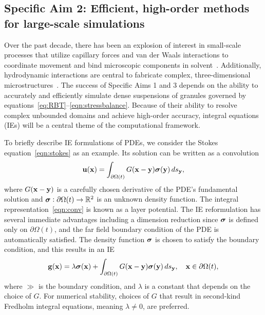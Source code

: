 \subsection{Specific Aim 2: Efficient, high-order methods for
large-scale simulations}
\label{sec:specificaim2}
Over the past decade, there has been an explosion of interest in
small-scale processes that utilize capillary forces and van der Waals
interactions to coordinate movement and bind microscopic components in
solvent~\cite{Pandey2011, Zhang2017, Siontorou2017}. Additionally,
hydrodynamic interactions are central to fabricate complex,
three-dimensional microstructures~\cite{Dasgupta2017, Leong2007,
Reynolds2019, Cho2010}.
The success of Specific Aims 1 and 3 depends on the ability to
accurately and efficiently simulate dense suspensions of granules
governed by equations~\eqref{eq:RBT}--\eqref{eqn:stressbalance}. Because
of their ability to resolve complex unbounded domains and achieve
high-order accuracy, integral equations (IEs) will be a central theme of
the computational framework. 

To briefly describe IE formulations of PDEs, we consider the Stokes
equation~\eqref{eqn:stokes} as an example. Its solution can be written
as a convolution 
\begin{align}
  \mathbf{u}(\mathbf{x}) = \int_{\partial\Omega(t)} G(\mathbf{x} - \mathbf{y}) \boldsymbol{\sigma}(\mathbf{y}) \, ds_{\mathbf{y}},
  \label{eqn:conv}
\end{align}
where $G(\mathbf{x} - \mathbf{y})$ is a carefully chosen derivative of the PDE's
fundamental solution and $\boldsymbol{\sigma}: \partial \Omega(t) \rightarrow \mathbb{R}^2$
is an unknown density function. The integral
representation~\eqref{eqn:conv} is known as a layer potential.
The IE reformulation has several immediate advantages including a
dimension reduction since $\boldsymbol{\sigma}$ is defined only on $\partial
\Omega(t)$, and the far field boundary condition of the PDE is
automatically satisfied. The density function $\boldsymbol{\sigma}$ is chosen to
satisfy the boundary condition, and this results in an IE 
\begin{align}
  \mathbf{g}(\mathbf{x}) = \lambda \boldsymbol{\sigma}(\mathbf{x}) + 
    \int_{\partial\Omega(t)} G(\mathbf{x} - \mathbf{y}) \boldsymbol{\sigma}(\mathbf{y}) \, ds_{\mathbf{y}},
    \quad \mathbf{x} \in \partial\Omega(t),
  \label{eqn:bie}
\end{align} where $\gg$ is the boundary condition, and $\lambda$ is a
constant that depends on the choice of $G$. For numerical stability,
choices of $G$ that result in second-kind Fredholm integral equations,
meaning $\lambda \neq 0$, are preferred.  


